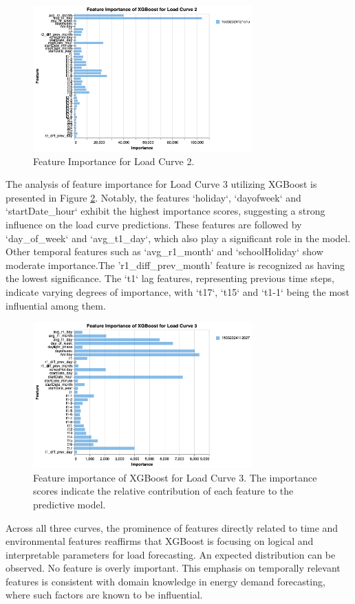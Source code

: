 \documentclass{article} %
\begin{document}
\begin{figure}[H]
    \centering
    \includegraphics[width=0.75\textwidth]{ressources/FeatureImportance/Feature Importance 2.png}
    \caption{Feature Importance for Load Curve 2.}
    \label{fig:feature_importance_2}
\end{figure}

The analysis of feature importance for Load Curve 3 utilizing XGBoost is presented in Figure \ref{fig:feature_importance_3}. Notably, the features `holiday`, `dayofweek` and `startDate\_hour` exhibit the highest importance scores, suggesting a strong influence on the load curve predictions. These features are followed by `day\_of\_week` and `avg\_t1\_day`, which also play a significant role in the model. Other temporal features such as `avg\_r1\_month` and `schoolHoliday` show moderate importance.The 'r1\_diff\_prev\_month' feature is recognized as having the lowest significance. The `t1` lag features, representing previous time steps, indicate varying degrees of importance, with `t17`, `t15` and `t1-1` being the most influential among them.
\begin{figure}[H]
    \centering
    \includegraphics[width=0.75\textwidth]{ressources/FeatureImportance/Feature Importance 3.png}
\caption{Feature importance of XGBoost for Load Curve 3. The importance scores indicate the relative contribution of each feature to the predictive model.}
\label{fig:feature_importance_3}
\end{figure}
Across all three curves, the prominence of features directly related to time and environmental features reaffirms that XGBoost is focusing on logical and interpretable parameters for load forecasting. An expected distribution can be observed. No feature is overly important. This emphasis on temporally relevant features is consistent with domain knowledge in energy demand forecasting, where such factors are known to be influential.
\end{document}
